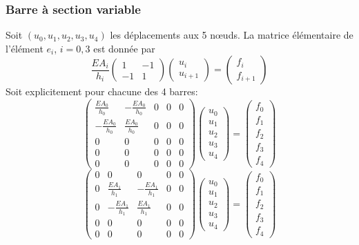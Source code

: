 \documentclass[a4paper]{article}
\begin{document}
\subsubsection*{Barre à section variable}
Soit $(u _0,u _1,u _2,u _3,u _4)$ les déplacements aux 5 nœuds. La matrice élémentaire de l'élément $e_i$, $i=0,3$ est donnée
par
\[\frac{EA_i}{h_i}\left(\begin{array}{rr} 
1&-1\\-1&1
\end{array}\right) \left(\begin{array}{l} 
u _{i}\\u _{i+1}
\end{array}\right)=\left(\begin{array}{r} 
f_{i}\\f_{i+1}
\end{array}\right)
\]
Soit explicitement pour chacune des 4 barres:
\[\left(\begin{array}{ccccc} 
\frac{EA_0}{h_0}&-\frac{EA_0}{h_0}&0&0&0\\-\frac{EA_0}{h_0}&\frac{EA_0}{h_0}&0&0&0\\
0&0&0&0&0\\
0&0&0&0&0\\
0&0&0&0&0
\end{array}\right) \left(\begin{array}{l} 
u _{0}\\u _{1}\\u _{2}\\u _{3}\\u _{4}
\end{array}\right)=\left(\begin{array}{c} 
f_{0}\\f_{1}\\f_{2}\\f_{3}\\f_{4}
\end{array}\right)
\]
\[\left(\begin{array}{ccccc} 
0&0&0&0&0\\
0&\frac{EA_1}{h_1}&-\frac{EA_1}{h_1}&0&0\\0&-\frac{EA_1}{h_1}&\frac{EA_1}{h_1}&0&0\\
0&0&0&0&0\\
0&0&0&0&0
\end{array}\right) \left(\begin{array}{l} 
u _{0}\\u _{1}\\u _{2}\\u _{3}\\u _{4}
\end{array}\right)=\left(\begin{array}{c} 
f_{0}\\f_{1}\\f_{2}\\f_{3}\\f_{4}
\end{array}\right)
\]
\end{document}
